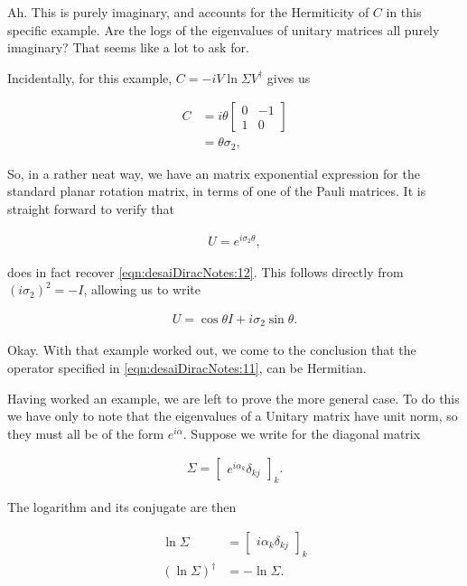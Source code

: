 Ah.  This is purely imaginary, and accounts for the Hermiticity of $C$ in this specific example.  Are the logs of the eigenvalues of unitary matrices all purely imaginary?  That seems like a lot to ask for.

Incidentally, for this example, $C = -i V \ln \Sigma V^\dagger$ gives us

\begin{align*}
C &= i \theta 
\begin{bmatrix}
0 & -1 \\
1 & 0
\end{bmatrix} \\
&= \theta \sigma_2,
\end{align*}

So, in a rather neat way, we have an matrix exponential expression for the standard planar rotation matrix, in terms of one of the Pauli matrices.  It is straight forward to verify that 

\begin{align}\label{eqn:desaiDiracNotes:13}
U = e^{i \sigma_2 \theta},
\end{align}

does in fact recover \ref{eqn:desaiDiracNotes:12}.  This follows directly from $(i \sigma_2)^2 = -I$, allowing us to write

\begin{align}\label{eqn:desaiDiracNotes:14}
U = \cos\theta I + i \sigma_2 \sin\theta.
\end{align}

Okay.  With that example worked out, we come to the conclusion that the operator specified in \ref{eqn:desaiDiracNotes:11}, can be Hermitian.

Having worked an example, we are left to prove the more general case.  To do this we have only to note that the eigenvalues of a Unitary matrix have unit norm, so they must all be of the form $e^{i\alpha}$.  Suppose we write for the diagonal matrix 

\begin{align}\label{eqn:desaiDiracNotes:11c}
\Sigma = 
{\begin{bmatrix}
e^{i\alpha_k} \delta_{kj}
\end{bmatrix}}_k.
\end{align}

The logarithm and its conjugate are then

\begin{align}\label{eqn:desaiDiracNotes:11d}
\ln \Sigma &= 
{\begin{bmatrix}
i\alpha_k \delta_{kj}
\end{bmatrix}}_k \\
(\ln \Sigma)^\dagger &= -\ln \Sigma.
\end{align}

